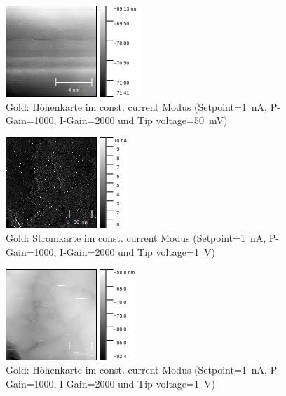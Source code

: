 \documentclass[sn-mathphys-num,iicol]{sn-jnl}
\theoremstyle{thmstyleone}
\theoremstyle{thmstyletwo}
\theoremstyle{thmstylethree}
\begin{document}
\begin{figure}[h]
        \centering
        \includegraphics[width=.5\textwidth]{../data/Gold_10nm_50mV_z.png}
        \caption{Gold: Höhenkarte im const. current Modus (Setpoint=\SI{1}{\nano A}, P-Gain=\SI{1000}{}, I-Gain=\SI{2000}{} und Tip voltage=\SI{50}{\milli V})} \label{fig:g10nm50mVz}
\end{figure}
\begin{figure}[h]
        \centering
        \includegraphics[width=.5\textwidth]{../data/Gold_200nm_current.png}
        \caption{Gold: Stromkarte im const. current Modus (Setpoint=\SI{1}{\nano A}, P-Gain=\SI{1000}{}, I-Gain=\SI{2000}{} und Tip voltage=\SI{1}{V})} \label{fig:g200nmc}
\end{figure}
\begin{figure}[h]
        \centering
        \includegraphics[width=.5\textwidth]{../data/Gold_200nm_z.png}
        \caption{Gold: Höhenkarte im const. current Modus (Setpoint=\SI{1}{\nano A}, P-Gain=\SI{1000}{}, I-Gain=\SI{2000}{} und Tip voltage=\SI{1}{V})} \label{fig:g200nmz}
\end{figure}
\end{document}
